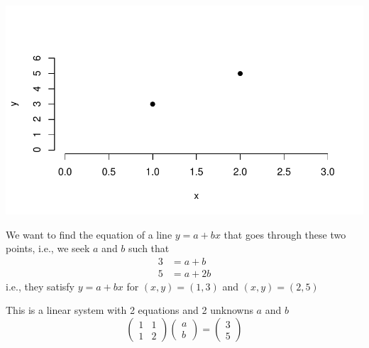 \documentclass[aspectratio=169]{beamer}\usepackage[]{graphicx}\usepackage[]{xcolor}
\makeatletter
\def\maxwidth{ %
  \ifdim\Gin@nat@width>\linewidth
    \linewidth
  \else
    \Gin@nat@width
  \fi
}
\newenvironment{kframe}{%
 \def\at@end@of@kframe{}%
 \ifinner\ifhmode%
  \def\at@end@of@kframe{\end{minipage}}%
  \begin{minipage}{\columnwidth}%
 \fi\fi%
 \def\FrameCommand##1{\hskip\@totalleftmargin \hskip-\fboxsep
 \colorbox{shadecolor}{##1}\hskip-\fboxsep
     \hskip-\linewidth \hskip-\@totalleftmargin \hskip\columnwidth}%
 \MakeFramed {\advance\hsize-\width
   \@totalleftmargin\z@ \linewidth\hsize
   \@setminipage}}%
 {\par\unskip\endMakeFramed%
 \at@end@of@kframe}
\newenvironment{knitrout}{}{} %
\makeatother
\begin{document}
\begin{frame}[fragile]
\begin{knitrout}
\begin{kframe}
{\ttfamily\noindent\bfseries{}}\end{kframe}
\end{knitrout}
\begin{knitrout}
\color{fgcolor}
\includegraphics[width=\maxwidth]{FIGS/matrix-methods-plot-2-points-and-line-1} 
\end{knitrout}
\end{frame}

\begin{frame}
We want to find the equation of a line $y=a+bx$ that goes through these two points, i.e., we seek $a$ and $b$ such that
$$
\begin{aligned}
3 &= a+b \\
5 &= a+2b
\end{aligned}
$$
i.e., they satisfy $y=a+bx$ for $(x,y)=(1,3)$ and $(x,y)=(2,5)$
\end{frame}

\begin{frame}
This is a linear system with 2 equations and 2 unknowns $a$ and $b$
$$
\begin{pmatrix}
1 & 1 \\ 1 & 2
\end{pmatrix}
\begin{pmatrix}
a \\ b
\end{pmatrix}
=
\begin{pmatrix}
3 \\ 5
\end{pmatrix}
$$
\end{frame}
\end{document}
